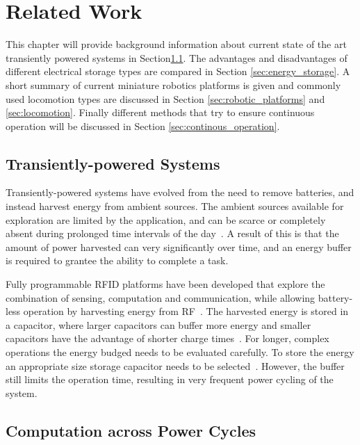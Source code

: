 \chapter{Related Work}
\label{chp:related_work}

This chapter will provide background information about current state of the art transiently powered systems in Section\ref{sec:tp_systems}. The advantages and disadvantages of different electrical storage types are compared in Section \ref{sec:energy_storage}. A short summary of current miniature robotics platforms is given and commonly used locomotion types are discussed in Section \ref{sec:robotic_platforms} and \ref{sec:locomotion}. Finally different methods that try to ensure continuous operation will be discussed in Section \ref{sec:continous_operation}.

\section{Transiently-powered Systems}
\label{sec:tp_systems}

Transiently-powered systems have evolved from the need to remove batteries, and instead harvest energy from ambient sources.
The ambient sources available for exploration are limited by the application, and can be scarce or completely absent during prolonged time intervals of the day~\cite{konstantopoulos_im_2016}.
A result of this is that the amount of power harvested can very significantly over time, and an energy buffer is required to grantee the ability to complete a task.

Fully programmable RFID platforms have been developed that explore the combination of sensing, computation and communication, while allowing battery-less operation by harvesting energy from RF~\cite{sample_transim_2008}. 
The harvested energy is stored in a capacitor, where larger capacitors can buffer more energy and smaller capacitors have the advantage of shorter charge times~\cite{gummerson_mobisys_2010}.
For longer, complex operations the energy budged needs to be evaluated carefully.
To store the energy an appropriate size storage capacitor needs to be selected~\cite{naderiparizi_rfid_2015}.
However, the buffer still limits the operation time, resulting in very frequent power cycling of the system.

\section{Computation across Power Cycles}
\label{sec:comp_pc} 

